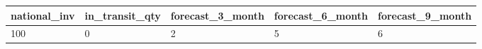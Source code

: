 \begin{tabular}{m{2cm}m{2cm}m{2cm}m{2cm}m{2cm}}
\toprule
 national\_inv &  in\_transit\_qty &  forecast\_3\_month &  forecast\_6\_month &  forecast\_9\_month \\
\midrule
          100 &               0 &                 2 &                 5 &                 6 \\
\bottomrule
\end{tabular}
